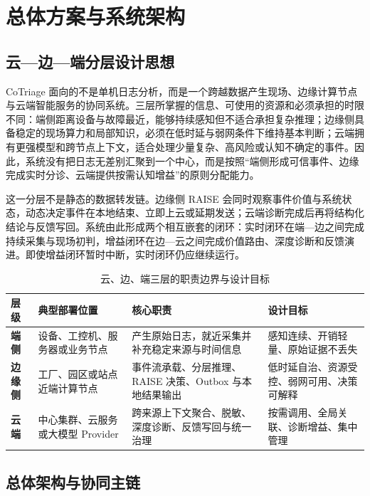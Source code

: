 \chapter{总体方案与系统架构}

\section{云—边—端分层设计思想}

CoTriage 面向的不是单机日志分析，而是一个跨越数据产生现场、边缘计算节点与云端智能服务的协同系统。三层所掌握的信息、可使用的资源和必须承担的时限不同：端侧距离设备与故障最近，能够持续感知但不适合承担复杂推理；边缘侧具备稳定的现场算力和局部知识，必须在低时延与弱网条件下维持基本判断；云端拥有更强模型和跨节点上下文，适合处理少量复杂、高风险或认知不确定的事件。因此，系统没有把日志无差别汇聚到一个中心，而是按照“端侧形成可信事件、边缘完成实时分诊、云端提供按需认知增益”的原则分配能力。

这一分层不是静态的数据转发链。边缘侧 RAISE 会同时观察事件价值与系统状态，动态决定事件在本地结束、立即上云或延期发送；云端诊断完成后再将结构化结论与反馈写回。系统由此形成两个相互嵌套的闭环：实时闭环在端—边之间完成持续采集与现场初判，增益闭环在边—云之间完成价值路由、深度诊断和反馈演进。即使增益闭环暂时中断，实时闭环仍应继续运行。

\begin{table}[htbp]
  \centering
  \small
  \caption{云、边、端三层的职责边界与设计目标}
  \label{tab:cloud-edge-end-responsibility}
  \begin{tabularx}{\textwidth}{>{\bfseries}p{} p{} X X}
    \toprule
    层级 & 典型部署位置 & 核心职责 & 设计目标 \\
    \midrule
    端侧 & 设备、工控机、服务器或业务节点 & 产生原始日志，就近采集并补充稳定来源与时间信息 & 感知连续、开销轻量、原始证据不丢失 \\
    边缘侧 & 工厂、园区或站点近端计算节点 & 事件流承载、分层推理、RAISE 决策、Outbox 与本地结果输出 & 低时延自治、资源受控、弱网可用、决策可解释 \\
    云端 & 中心集群、云服务或大模型 Provider & 跨来源上下文聚合、脱敏、深度诊断、反馈写回与统一治理 & 按需调用、全局关联、诊断增益、集中管理 \\
    \bottomrule
  \end{tabularx}
\end{table}

\section{总体架构与协同主链}

